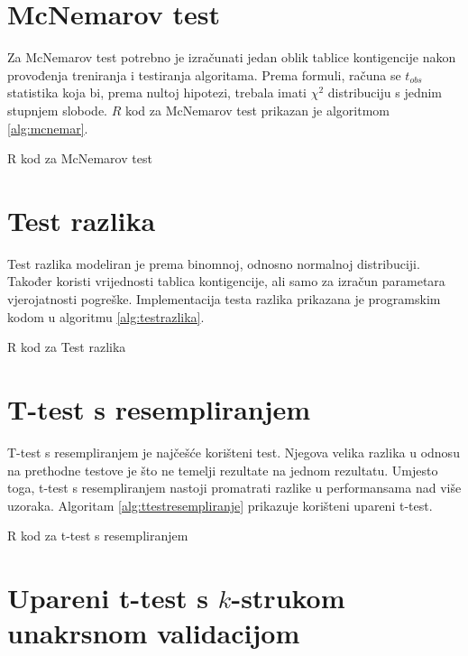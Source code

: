 \section{McNemarov test}

Za McNemarov test potrebno je izračunati jedan oblik tablice kontigencije nakon provođenja treniranja i testiranja algoritama. Prema formuli, računa se $t_{obs}$ statistika koja bi, prema nultoj hipotezi, trebala imati $\chi^2$ distribuciju s jednim stupnjem slobode. $R$ kod za McNemarov test prikazan je algoritmom \ref{alg:mcnemar}.

\begin{algorithm}

\caption{R kod za McNemarov test}
\label{alg:mcnemar}
\end{algorithm}

\section{Test razlika}

Test razlika modeliran je prema binomnoj, odnosno normalnoj distribuciji. Također koristi vrijednosti tablica kontigencije, ali samo za izračun parametara vjerojatnosti pogreške. 
Implementacija testa razlika prikazana je programskim kodom u algoritmu \ref{alg:testrazlika}.

\begin{algorithm}

\caption{R kod za Test razlika}
\label{alg:testrazlika}
\end{algorithm}

\section{T-test s resempliranjem}

T-test s resempliranjem je najčešće korišteni test. Njegova velika razlika u odnosu na prethodne testove je što ne temelji rezultate na jednom rezultatu. Umjesto toga, t-test s resempliranjem nastoji promatrati razlike u performansama nad više uzoraka. Algoritam 
\ref{alg:ttestresempliranje} prikazuje korišteni upareni t-test. 

\begin{algorithm}

\caption{R kod za t-test s resempliranjem}
\label{alg:ttestresempliranje}
\end{algorithm}

\section{Upareni t-test s $k$-strukom unakrsnom validacijom}

